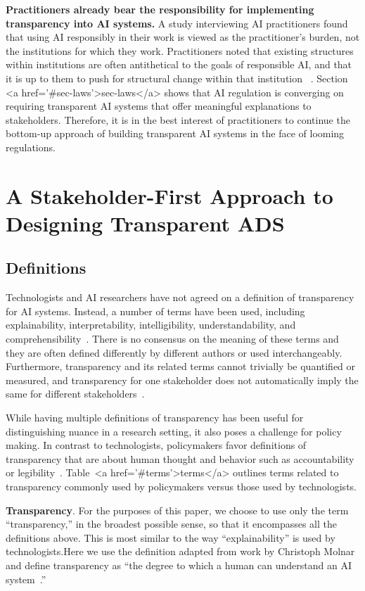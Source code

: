 \documentclass[sigconf, nonacm]{acmart}
\begin{document}
{\bf Practitioners already bear the responsibility for implementing transparency into AI systems.} A study interviewing AI practitioners found that using AI responsibly in their work is viewed as the practitioner’s burden, not the institutions for which they work. Practitioners noted that existing structures within institutions are often antithetical to the goals of responsible AI, and that it is up to them to push for structural change within that institution ~\cite{rakova2020responsible}. Section <a href='#sec-laws'>sec-laws</a> shows that AI regulation is converging on requiring transparent AI systems that offer meaningful explanations to stakeholders. Therefore, it is in the best interest of practitioners to continue the bottom-up approach of building transparent AI systems in the face of looming regulations.
\section{A Stakeholder-First Approach to Designing Transparent ADS}
\label{sec:explain}

\subsection{Definitions}

Technologists and AI researchers have not agreed on a definition of transparency for AI systems. Instead, a number of terms have been used, including explainability, interpretability, intelligibility, understandability, and comprehensibility~\cite{DBLP:journals/corr/abs-2012-01805}. There is no consensus on the meaning of these terms and they are often defined differently by different authors or used interchangeably. Furthermore, transparency and its related terms cannot trivially be quantified or measured, and transparency for one stakeholder does not automatically imply the same for different stakeholders~\cite{lipton2018mythos, hind2019explaining}.

While having multiple definitions of transparency has been useful for distinguishing nuance in a research setting, it also poses a challenge for policy making. In contrast to technologists, policymakers favor definitions of transparency that are about human thought and behavior such as accountability or legibility~\cite{DBLP:conf/aies/KrafftYKHB20}. Table~<a href='#terms'>terms</a> outlines terms related to transparency commonly used by policymakers versus those used by technologists.

{\bf Transparency}. For the purposes of this paper, we choose to use only the term ``transparency,'' in the broadest possible sense, so that it encompasses all the definitions above. This is most similar to the way ``explainability'' is used by technologists.Here we use the definition adapted from work by Christoph Molnar and define transparency as ``the degree to which a human can understand an AI system~\cite{molnar2019}.'' 
\end{document}
